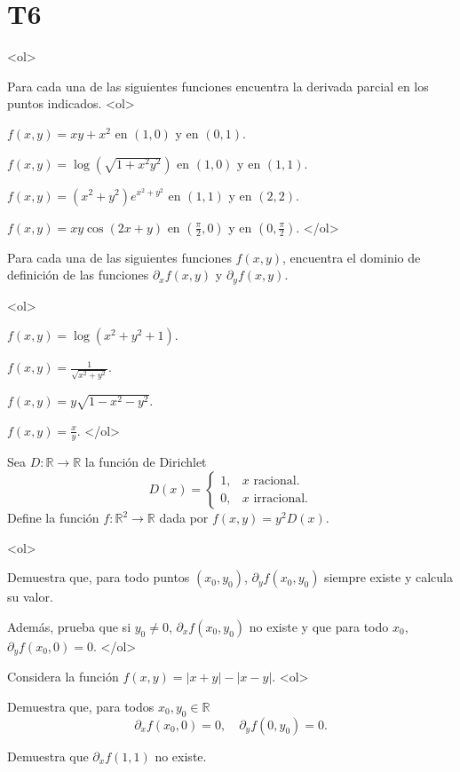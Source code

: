 \documentclass{article}
\theoremstyle{definition}
\begin{document}
  \section*{T6 }

  <ol>

       \item Para cada una de las siguientes funciones encuentra la derivada parcial en los puntos indicados.
       <ol>
       \item $f(x,y)=xy+x^2$ en $(1,0)$ y en $(0,1)$.
       \item $f(x,y)=\log(\sqrt{1+x^2y^2})$ en $(1,0)$ y en $(1,1)$.
       \item $f(x,y)=(x^2+y^2)e^{x^2+y^2}$ en $(1,1)$ y en $(2,2)$.
       \item $f(x,y)=xy\cos(2x+y)$ en $(\frac{\pi}{2},0)$ y en $(0,\frac{\pi}{2})$.
       </ol>
       

     \item Para cada una de las siguientes funciones $f(x,y)$, encuentra el dominio de definición
       de las funciones $\partial_xf(x,y)$ y $\partial_yf(x,y)$.

       <ol>
       \item $f(x,y)=\log(x^2+y^2+1)$.
       \item $f(x,y)=\frac{1}{\sqrt{x^2+y^2}}$.
       \item $f(x,y)=y\sqrt{1-x^2-y^2}$.
         \item $f(x,y)=\frac{x}{y}$.
       </ol>


       
     \item Sea $D:\mathbb{R}\to \mathbb{R}$ la función de Dirichlet
		$$
		D(x)=\left\{
		\begin{array}{cc}
		1, & \textrm{$x$ racional.}\\
		0, & \textrm{$x$ irracional.}
		\end{array}
		\right.	
		$$
       Define la función $f:\mathbb{R}^2 \to \mathbb{R}$ dada por $f(x,y)=y^2D(x)$.
       
       <ol>
       \item Demuestra que, para todo puntos $(x_0,y_0)$, $\partial_yf(x_0,y_0)$ siempre existe y calcula su valor.
       \item Además, prueba que si $y_0\ne 0$, $\partial_xf(x_0,y_0)$ no existe y que para todo
       $x_0$, $\partial_yf(x_0,0)=0$. 
       </ol>

       

     \item Considera la función $f(x,y)=|x+y|-|x-y|$.
       <ol>
       \item Demuestra que, para todos $x_0,y_0\in \mathbb{R}$
         $$
         \partial_xf(x_0,0)=0, \quad \partial_yf(0,y_0)=0.
         $$
       \item Demuestra que $\partial_xf(1,1)$ no existe.
         
\end{document}
